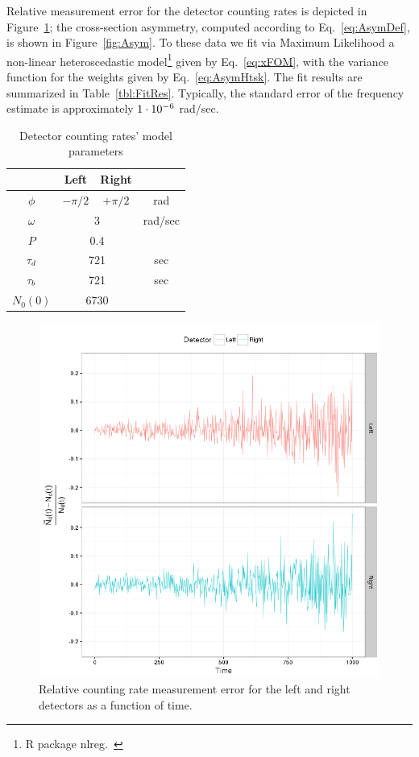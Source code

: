 \documentclass{article}
\begin{document}
Relative measurement error for the detector counting rates is depicted in Figure~\ref{fig:LRDetErr}; the cross-section asymmetry, computed according to Eq.~\eqref{eq:AsymDef}, is shown in Figure~\ref{fig:Asym}.
To these data we fit via Maximum Likelihood a non-linear heteroscedastic model\footnote{R package nlreg.~\cite{NLREG}} given by Eq.~\eqref{eq:xFOM}, with the variance function for the weights given by Eq.~\eqref{eq:AsymHtsk}. The fit results are summarized in Table~\ref{tbl:FitRes}. Typically, the standard error of the frequency estimate is approximately ${1}\cdot 10^{-6}$ rad/sec.
\begin{table}[h]
	\centering
	\caption{Detector counting rates' model parameters\label{tbl:DetCntRtParam}}
	\begin{tabular}{cccc}
		\hline
		         &   Left   &     Right     &  \\ \hline
		 $\phi$  & $-\pi/2$ &   $+\pi/2$    &   rad   \\
		$\omega$ &  \multicolumn{2}{c}{3}   & rad/sec \\
		  $P$    & \multicolumn{2}{c}{0.4}  &  \\
		 $\tau_d$  & \multicolumn{2}{c}{721}  &   sec   \\
		 $\tau_b$  & \multicolumn{2}{c}{721}  &   sec   \\
		$N_0(0)$ & \multicolumn{2}{c}{6730} &  \\ \hline
	\end{tabular}
\end{table}

\begin{figure}[h]
	\centering
	\includegraphics[scale=.85]{img/Final/LR_detector_relErr}
	\caption{Relative counting rate measurement error for the left and right detectors as a function of time.\label{fig:LRDetErr}}
\end{figure}
\end{document}
